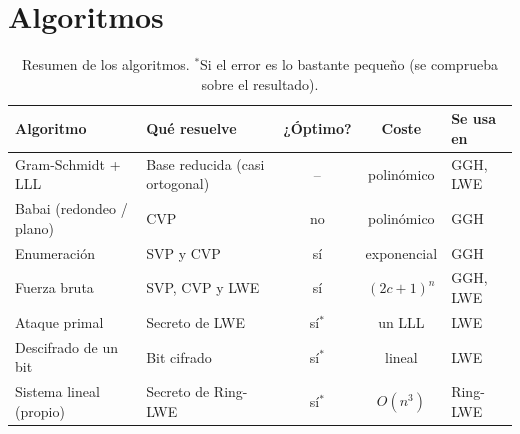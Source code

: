\section{Algoritmos}
\label{sec:algoritmos}


\begin{table}[H]
\centering\small
\begin{tabularx}{\linewidth}{@{}l Y c c l@{}}
  \toprule
  Algoritmo & Qué resuelve & ¿Óptimo? & Coste & Se usa en \\
  \midrule
  Gram-Schmidt + LLL       & Base reducida (casi ortogonal) & -- & polinómico & GGH, LWE \\
  Babai (redondeo / plano) & CVP                            & no & polinómico & GGH \\
  Enumeración              & SVP y CVP                      & sí & exponencial & GGH \\
  Fuerza bruta             & SVP, CVP y LWE                 & sí & $(2c+1)^n$ & GGH, LWE \\
  Ataque primal            & Secreto de LWE                 & sí$^\ast$ & un LLL & LWE \\
  Descifrado de un bit     & Bit cifrado                    & sí$^\ast$ & lineal & LWE \\
  Sistema lineal (propio)  & Secreto de Ring-LWE            & sí$^\ast$ & $O(n^3)$ & Ring-LWE \\
  \bottomrule
\end{tabularx}
\caption{Resumen de los algoritmos. $^\ast$Si el error es lo bastante pequeño (se comprueba
  sobre el resultado).}
\label{tab:algoritmos}
\end{table}

